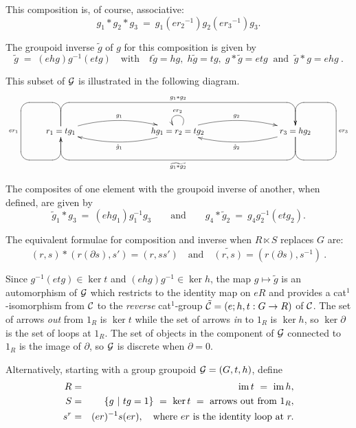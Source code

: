 \noindent
This composition is, of course, associative:
$$
g_1 * g_2 * g_3 ~=~ g_1({er_2}^{-1})g_2({er_3}^{-1})g_3.
$$

\noindent
The groupoid inverse  $\tilde{g}$  of  $g$  for this composition is given by
$$
\tilde{g} \; = \; (ehg)g^{-1}(etg)
\quad \mbox{with} \quad  
t \tilde{g} = hg, \; h \tilde{g} = tg, \; g * \tilde{g} = etg  
\;\; \mbox{and} \;\;
\tilde{g} * g = ehg~.
$$  

This subset of $\mathcal{G}$ is illustrated in the following diagram. 
$$
\xy
\xymatrix{
  &&&&&&&& \\
  &  r_1=tg_1 \ar `u[-1,-1] `[1,-1] `[1,0]_{er_1} `[0,0] [0,0]
            \ar@/^3ex/[rrr]^{g_1}
            \ar `u[-1,1] `[0,6]^{g_1 * g_2} [0,6]
  &&& hg_1=r_2=tg_2 \ar@/^3ex/[rrr]^{g_2}
                    \ar@/^3ex/[lll]^{\tilde{g}_1}
                    \ar@(ur,ul)_{er_2}
     &&& r_3=hg_2 \ar `d[1,1] `[-1,1] `[-1,0]_{er_3} `[0,0] [0,0]
                  \ar@/^3ex/[lll]^{\tilde{g}_2}
                  \ar `d[1,-1] `[0,-6]^{\widetilde{g_1 * g_2}} [0,-6] 
         & \\
  &&&&&&&& \\
}
\endxy
$$

\noindent
The composites of one element with the groupoid inverse of another, 
when defined, are given by 
\begin{equation} \label{eq:inv-comps}
\tilde{g}_1 * g_3 ~=~ (ehg_1)g_1^{-1}g_3
\qquad\mbox{and}\qquad
g_4 * \tilde{g}_2 ~=~ g_4g_2^{-1}(etg_2).
\end{equation}

\medskip\noindent
The equivalent formulae for composition and inverse 
when  $R \ltimes S$  replaces $G$ are:
$$
(r, s) * (r (\partial s), s') = (r, ss')
\quad \mbox{and} \quad  
\widetilde{(r,s)} = (r(\partial s), s^{-1})~.
$$

Since  $g^{-1}(etg) \in \ker t$  and  $(ehg)g^{-1} \in \ker h$,
the map  $g \mapsto \tilde{g}$  is an automorphism of  $\mathcal{G}$
which restricts to the identity map on  $eR$  and
provides a cat$^1$-isomorphism from  $\mathcal{C}$  to the \emph{reverse}
cat$^1$-group $\tilde{\mathcal{C}} = (e;h,t : G \to R)$ of $\mathcal{C}$.
The set of arrows \emph{out} from  $1_R$  is  $\ker t$
while the set of arrows \emph{in} to  $1_R$  is  $\ker h$,
so  $\ker \partial$  is the set of loops at  $1_R$.
The set of objects in the component of  $\mathcal{G}$
connected to  $1_R$  is the image of  $\partial$,
so  $\mathcal{G}$  is discrete when  $\partial = 0$.

Alternatively, starting with a group groupoid $\mathcal{G} = (G,t,h)$, define
\begin{eqnarray*}
  R & = & \mathrm{im}\, t ~=~ \mathrm{im}\, h, \\
  S & = & \{g ~|~ tg = 1\} ~=~ \ker t ~=~ \mbox{arrows out from}~ 1_R, \\
s^r & = & (er)^{-1}s(er), 
\quad\text{where}~ er ~\text{is the identity loop at}~ r.
\end{eqnarray*}

